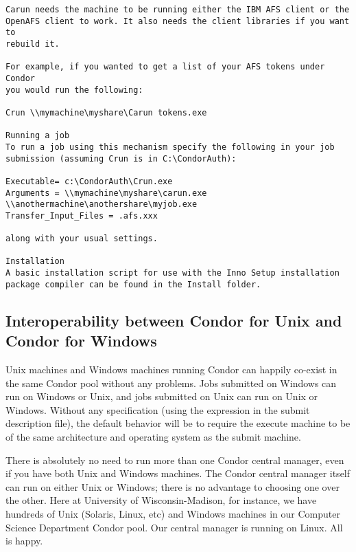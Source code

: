 \begin{verbatim}
Carun needs the machine to be running either the IBM AFS client or the 
OpenAFS client to work. It also needs the client libraries if you want to 
rebuild it.

For example, if you wanted to get a list of your AFS tokens under Condor 
you would run the following:

Crun \\mymachine\myshare\Carun tokens.exe

Running a job
To run a job using this mechanism specify the following in your job 
submission (assuming Crun is in C:\CondorAuth):

Executable= c:\CondorAuth\Crun.exe
Arguments = \\mymachine\myshare\carun.exe 
\\anothermachine\anothershare\myjob.exe
Transfer_Input_Files = .afs.xxx

along with your usual settings.

Installation
A basic installation script for use with the Inno Setup installation 
package compiler can be found in the Install folder.
\end{verbatim}




\subsection{Interoperability between Condor for Unix and Condor for Windows}

Unix machines and Windows machines running Condor can happily
co-exist in the same Condor pool without any problems.
Jobs submitted on Windows can run on Windows or Unix,
and jobs submitted on Unix can run on Unix or Windows.
Without any specification
(using the  expression in the submit description file),
the default behavior will be to 
require the execute machine to be of the same architecture and operating
system as the submit machine.

There is absolutely no need to run more than one Condor central manager,
even if you have both Unix and Windows machines.  The Condor central manager
itself can run on either Unix or Windows; there is no advantage to choosing
one over the other.  Here at University of Wisconsin-Madison, for
instance, we have hundreds of Unix (Solaris, Linux, etc) and
Windows machines in our Computer Science Department Condor pool.
Our central manager is running on Linux.  All is happy.


